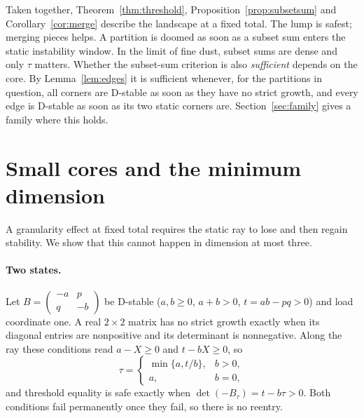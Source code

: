 \documentclass[11pt,a4paper]{article}
\theoremstyle{plain}
\theoremstyle{definition}
\theoremstyle{remark}
\begin{document}
Taken together, Theorem~\ref{thm:threshold}, Proposition~\ref{prop:subsetsum}
and Corollary~\ref{cor:merge} describe the landscape at a fixed total. The lump
is safest; merging pieces helps. A partition is doomed as soon as a subset sum
enters the static instability window. In the limit of fine dust, subset sums
are dense and only $\tau$ matters. Whether the subset-sum criterion is also
\emph{sufficient} depends on the core. By Lemma~\ref{lem:edges} it is
sufficient whenever, for the partitions in question, all corners are D-stable
as soon as they have no strict growth, and every edge is D-stable as soon as
its two static corners are.
Section~\ref{sec:family} gives a family where this holds.

\section{Small cores and the minimum dimension}\label{sec:small}

A granularity effect at fixed total requires the static ray to lose and then
regain stability. We show that this cannot happen in dimension at most three.

\paragraph{Two states.}
Let $B=\left(\begin{smallmatrix}-a&p\\ q&-b\end{smallmatrix}\right)$ be D-stable
($a,b\ge0$, $a+b>0$, $t=ab-pq>0$) and load coordinate one. A real $2\times2$
matrix has no strict growth exactly when its diagonal entries are
nonpositive and its determinant is nonnegative. Along the ray these
conditions read $a-X\ge0$ and $t-bX\ge0$, so
\[
 \tau=\begin{cases}\min\{a,t/b\},&b>0,\\ a,&b=0,\end{cases}
\]
and threshold equality is safe exactly when $\det(-B_\tau)=t-b\tau>0$. Both
conditions fail permanently once they fail, so there is no reentry.
\end{document}
